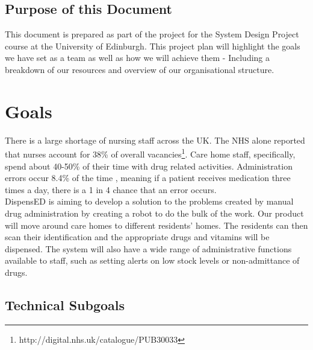 \documentclass[a4paper,10pt,DIV10,openright,openbib]{scrreprt}
\begin{document}
\section{Purpose of this Document}
This document is prepared as part of the project for the System Design Project course
at the University of Edinburgh. This project plan will highlight the goals we
have set as a team as well as how we will achieve them - Including a breakdown
of our resources and overview of our organisational structure.
\vspace{2cm}
{\let\clearpage\relax  \chapter{Goals}}

There is a large shortage of nursing staff across the UK. The NHS alone reported
that nurses account for 38\% of overall vacancies\footnote{http://digital.nhs.uk/catalogue/PUB30033}.
Care home staff, specifically, spend about 40-50\% of their time with drug
related activities. Administration errors occur 8.4\% of the time \cite{CHUMS},
meaning if a patient receives medication three times a day, there is a 1 in 4
chance that an error occurs.\\
DispensED is aiming to develop a solution to the problems created by manual drug
administration by creating a robot to do the bulk of the work. Our product will
move around care homes to different residents' homes. The residents can then
scan their identification and the appropriate drugs and vitamins will be
dispensed. The system will also have a wide range of administrative functions
available to staff, such as setting alerts on low stock levels or non-admittance of drugs.

\section{Technical Subgoals}
\end{document}
